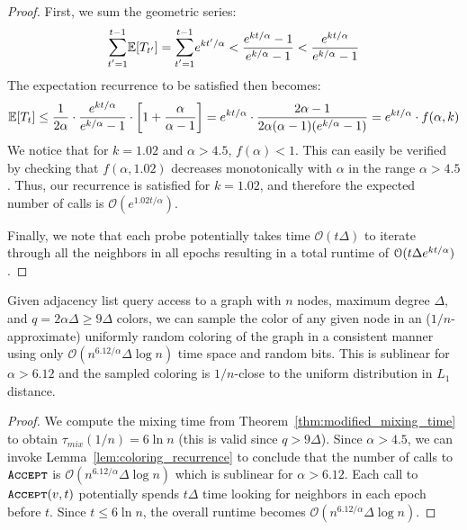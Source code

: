\begin{proof}
First, we sum the geometric series:
\[
\mathlarger\sum\limits_{t'=1}^{t-1} \mathbb E[T_{t'}] = \mathlarger\sum\limits_{t'=1}^{t-1} e^{\hagu t'/\alpha}
< \frac{e^{\hagu t/\alpha}-1}{e^{\hagu/\alpha}-1} < \frac{e^{\hagu t/\alpha}}{e^{\hagu/\alpha}-1}
\]
The expectation recurrence to be satisfied then becomes:
\[
\mathbb E[T_t]\le \frac 1{2\alpha}\cdot \frac{e^{k t/\alpha}}{e^{k/\alpha}-1}\cdot \left[ 1+ \frac{\alpha}{\alpha-1} \right]
= e^{k t/\alpha}\cdot \frac{2\alpha-1}{2\alpha(\alpha-1)(e^{k/\alpha}-1)} = e^{k t/\alpha}\cdot f(\alpha, k)
\]
We notice that for $k=1.02$ and $\alpha > 4.5$, $f(\alpha) < 1$.
This can easily be verified by checking that $f(\alpha,1.02)$ decreases monotonically with $\alpha$ in the range $\alpha > 4.5$.
Thus, our recurrence is satisfied for $k=1.02$, and therefore the expected number of calls is $\mathcal O(e^{1.02t/\alpha})$.

Finally, we note that each probe potentially takes time $\mathcal O(t\Delta)$ to iterate through all the neighbors in all epochs
resulting in a total runtime of $\mathcal O(t\Delta e^{k t/\alpha})$.
\end{proof}


\begin{theorem}
\label{thm:coloring_generator_main}
Given adjacency list query access to a graph with $n$ nodes, maximum degree $\Delta$, and $q=2\alpha\Delta \ge 9\Delta$ colors,
we can sample the color of any given node in an ($1/n$-approximate) uniformly random coloring of the graph in a consistent manner
using only $\mathcal O(n^{6.12/\alpha}\Delta\log n)$ time space and random bits.
This is sublinear for $\alpha > 6.12$ and the sampled coloring is $1/n$-close to the uniform distribution in $L_1$ distance.
\end{theorem}
\begin{proof}
We compute the mixing time from Theorem~\ref{thm:modified_mixing_time} to obtain $\tau_{mix}(1/n) = 6\ln n$ (this is valid since $q > 9\Delta$).
Since $\alpha > 4.5$, we can invoke Lemma~\ref{lem:coloring_recurrence} to conclude that
the number of calls to $\texttt{\textsc{Accept}}$ is $\mathcal O(n^{6.12/\alpha}\Delta\log n)$  which is sublinear for $\alpha > 6.12$.
Each call to $\texttt{\textsc{Accept}}(v,t)$ potentially spends $t\Delta$ time looking for neighbors in each epoch before $t$.
Since $t \le 6\ln n$, the overall runtime becomes $\mathcal O(n^{6.12/\alpha}\Delta\log n)$.
\end{proof}

